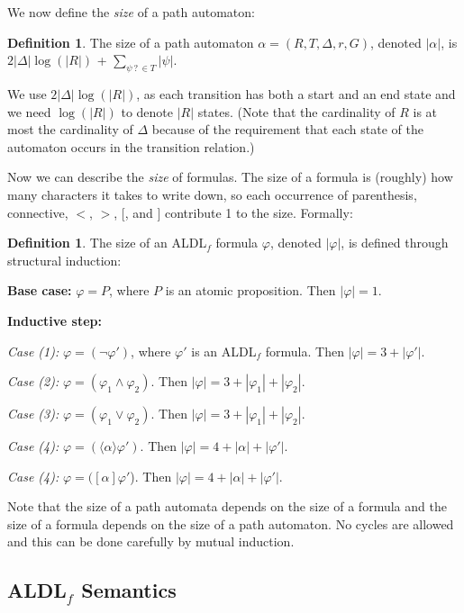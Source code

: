 \documentclass{lmcs}
\theoremstyle{definition}
\newtheorem{definition}[thm]{Definition}
\newcommand{\dbox}[1]{\langle #1 \rangle}
\newcommand{\bbox}[1]{[ #1 ]}
\DeclareMathOperator{\?}{?}
\begin{document}
We now define the \emph{size} of a path automaton:
\begin{definition}
The size of a path automaton $\alpha =(R, T, \Delta, r, G)$, denoted $|\alpha|$, is $2|\Delta|\log(|R|)$ + $\sum\limits_{\psi\? \in T}^{} |\psi|$.
\end{definition}

We use $2|\Delta|\log (|R|)$,  as each transition has both a start and an end state and we need $\log(|R|)$ to denote $|R|$ states. (Note that the cardinality of $R$ is at most the cardinality of $\Delta$ because of the requirement that each state of the automaton occurs in the transition relation.)


Now we can describe the \emph{size} of formulas. The size of a formula is (roughly) how many characters it takes to write down, so each occurrence of parenthesis, connective, $<$, $>$, [, and ] contribute 1 to the size. Formally: 
\begin{definition}
  The size of an ALDL$_f$ formula $\varphi$, denoted $|\varphi|$, is defined through structural induction:

  \textbf{Base case:} $\varphi = P$, where $P$ is an atomic proposition. Then $|\varphi| = 1$.

  \textbf{Inductive step:}

  \textit{Case (1):} $\varphi = (\neg\varphi')$, where $\varphi'$ is an ALDL$_f$ formula. Then $|\varphi| = 3 + |\varphi'|$.

  \textit{Case (2):} $\varphi = (\varphi_1 \wedge \varphi_2)$. Then $|\varphi| = 3 + |\varphi_1| + |\varphi_2|$.

  \textit{Case (3):} $\varphi = (\varphi_1 \vee \varphi_2)$. Then $|\varphi| = 3 + |\varphi_1| + |\varphi_2|$.


  \textit{Case (4):} $\varphi = (\dbox{\alpha}\varphi')$. Then $|\varphi| = 4 + |\alpha| + |\varphi'|$.

  \textit{Case (4):} $\varphi = (\bbox{\alpha}\varphi'$). Then $|\varphi| = 4 + |\alpha| + |\varphi'|$.

  \end{definition}

  Note that the size of a path automata depends on the size of a formula and the size of a formula depends on the size of a path automaton. No cycles are allowed and this can be done carefully by mutual induction.


\subsection{\texorpdfstring{ALDL$_f$ Semantics}{ALDLf Semantics}}
\end{document}
